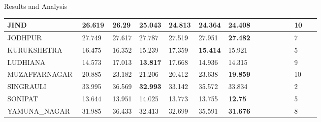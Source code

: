 \documentclass[12pt, aspectratio=169]{beamer}
\begin{document}
\begin{frame}{Results and Analysis}
\begin{table}
\begin{tabular}[c]{|p{0.165\linewidth}|p{0.096\linewidth}|p{0.044\linewidth}|p{0.044\linewidth}|p{0.06\linewidth}|p{0.044\linewidth}|p{0.206\linewidth}|p{0.08\linewidth}|}
		 JIND           & 26.619          & 26.29     & 25.043          & 24.813     & \textbf{24.364}           & 24.408          & 10     \\ \hline
		 JODHPUR        & 27.749          & 27.617    & 27.787          & 27.519     & 27.951              & \textbf{27.482} & 7      \\ \hline
		 KURUKSHETRA    & 16.475          & 16.352    & 15.239          & 17.359     & \textbf{15.414}           & 15.921          & 5      \\ \hline
		 LUDHIANA       & 14.573          & 17.013    & \textbf{13.817} & 17.668     & 14.936                    & 14.315          & 9      \\ \hline
		 MUZAFFARNAGAR  & 20.885          & 23.182    & 21.206          & 20.412     & 23.638                   & \textbf{19.859} & 10     \\ \hline
		 SINGRAULI      & 33.995          & 36.569    & \textbf{32.993} & 33.142     & 35.572                    & 33.834          & 2      \\ \hline
		 SONIPAT        & 13.644          & 13.951    & 14.025          & 13.773     & 13.755                    & \textbf{12.75}  & 5      \\ \hline
		 YAMUNA\_NAGAR  & 31.985          & 36.433    & 32.413          & 32.699     & 35.591                    & \textbf{31.676} & 8     \\ \hline 
		\end{tabular}
	\end{table}
\end{frame}
\end{document}

